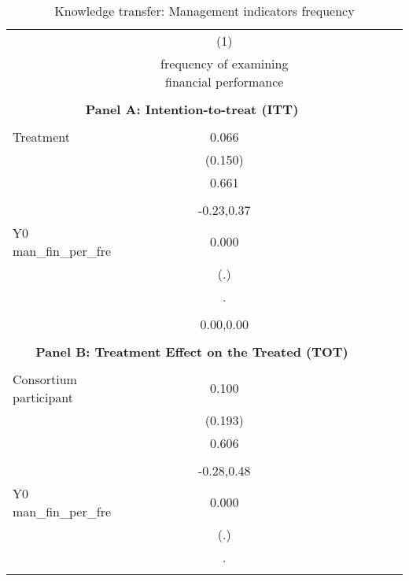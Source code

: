 \begin{table}[!h] \centering \\ \caption{Knowledge transfer: Management indicators frequency} \\ \begin{adjustbox}{width=\columnwidth,center} \\ \begin{tabular}{l*{8}{c}} \hline\hline
                    &\multicolumn{1}{c}{(1)}         \\
                    &frequency of examining financial performance         \\
\hline \\ \multicolumn{7}{c}{\textbf{Panel A: Intention-to-treat (ITT)}} \\\\[-1ex]
Treatment           &       0.066         \\
                    &     (0.150)         \\
                    &       0.661         \\
                    &                     \\
                    &  -0.23,0.37         \\
Y0 man\_fin\_per\_fre  &       0.000         \\
                    &         (.)         \\
                    &           .         \\
                    &                     \\
                    &   0.00,0.00         \\
\hline \\ \multicolumn{7}{c}{\textbf{Panel B: Treatment Effect on the Treated (TOT)}} \\\\[-1ex]
Consortium participant&       0.100         \\
                    &     (0.193)         \\
                    &       0.606         \\
                    &                     \\
                    &  -0.28,0.48         \\
Y0 man\_fin\_per\_fre  &       0.000         \\
                    &         (.)         \\
                    &           .         \\
                    &                     \\

\end{tabular}
\end{adjustbox}
\end{table}
